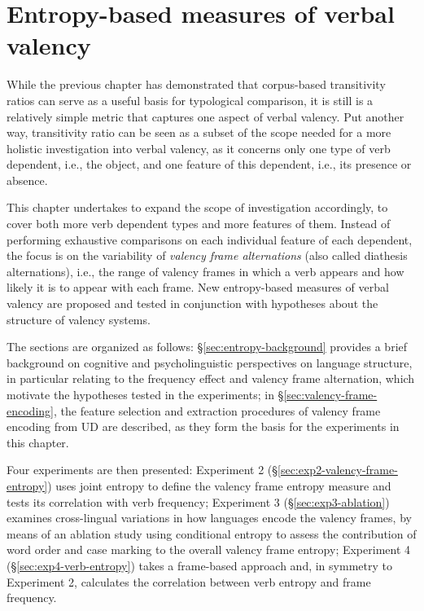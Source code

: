 \chapter{Entropy-based measures of verbal valency}\label{chapter:entropy}

While the previous chapter has demonstrated that corpus-based transitivity ratios can serve as a useful basis for typological comparison, it is still is a relatively simple metric that captures one aspect of verbal valency. Put another way, transitivity ratio can be seen as a subset of the scope needed for a more holistic investigation into verbal valency, as it concerns only one type of verb dependent, i.e., the object, and one feature of this dependent, i.e., its presence or absence. 

This chapter undertakes to expand the scope of investigation accordingly, to cover both more verb dependent types and more features of them. Instead of performing exhaustive comparisons on each individual feature of each dependent, the focus is on the variability of \textit{valency frame alternations} (also called diathesis alternations), i.e., the range of valency frames in which a verb appears and how likely it is to appear with each frame. New entropy-based measures of verbal valency are proposed and tested in conjunction with hypotheses about the structure of valency systems.

The sections are organized as follows: §\ref{sec:entropy-background} provides a brief background on cognitive and psycholinguistic perspectives on language structure, in particular relating to the frequency effect and valency frame alternation, which motivate the hypotheses tested in the experiments; in §\ref{sec:valency-frame-encoding}, the feature selection and extraction procedures of valency frame encoding from UD are described, as they form the basis for the experiments in this chapter. 

Four experiments are then presented: Experiment 2 (§\ref{sec:exp2-valency-frame-entropy}) uses joint entropy to define the valency frame entropy measure and tests its correlation with verb frequency; Experiment 3 (§\ref{sec:exp3-ablation}) examines cross-lingual variations in how languages encode the valency frames, by means of an ablation study using conditional entropy to assess the contribution of word order and case marking to the overall valency frame entropy; Experiment 4 (§\ref{sec:exp4-verb-entropy}) takes a frame-based approach and, in symmetry to Experiment 2, calculates the correlation between verb entropy and frame frequency.

